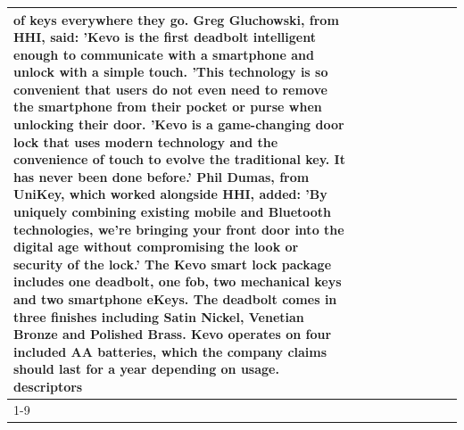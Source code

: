 \begin{table}[H]
\begin{tabular}{lllrlllll}
of keys everywhere they go. Greg Gluchowski, from HHI, said: 'Kevo is the first deadbolt intelligent enough to communicate with a smartphone and unlock with a simple touch. 'This technology is so convenient that users do not even need to remove the smartphone from their pocket or purse when unlocking their door. 'Kevo is a game-changing door lock that uses modern technology and the convenience of touch to evolve the traditional key. It has never been done before.' Phil Dumas, from UniKey, which worked alongside HHI, added: 'By uniquely combining existing mobile and Bluetooth technologies, we’re bringing your front door into the digital age without compromising the look or security of the lock.' The Kevo smart lock package includes one deadbolt, one fob, two mechanical keys and two smartphone eKeys. The deadbolt comes in three finishes including Satin Nickel, Venetian Bronze and Polished Brass. Kevo operates on four included AA batteries, which the company claims should last for a year depending on usage. descriptors \\
\cline{1-9}

\end{tabular}
\end{table}
